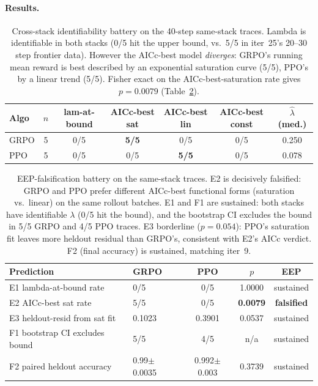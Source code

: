 \documentclass{article}
\begin{document}
\paragraph{Results.}

\begin{table}[t]
\centering\small
\begin{tabular}{lcccccc}
\toprule
Algo & $n$ & lam-at-bound & AICc-best sat & AICc-best lin & AICc-best const & $\hat\lambda$ (med.) \\
\midrule
GRPO & 5 & 0/5 & \textbf{5/5} & 0/5 & 0/5 & 0.250 \\
PPO  & 5 & 0/5 & 0/5 & \textbf{5/5} & 0/5 & 0.078 \\
\bottomrule
\end{tabular}
\caption{Cross-stack identifiability battery on the 40-step same-stack
  traces. Lambda is identifiable in both stacks (0/5 hit the upper
  bound, vs.\ 5/5 in iter~25's 20--30 step frontier data). However the
  AICc-best model \emph{diverges}: GRPO's running mean reward is best
  described by an exponential saturation curve (5/5), PPO's by a linear
  trend (5/5). Fisher exact on the AICc-best-saturation rate gives
  $p=0.0079$ (Table~\ref{tab:iter29-eep}).}
\label{tab:iter29-cross-stack}
\end{table}

\begin{table}[t]
\centering\small
\begin{tabular}{llccc}
\toprule
Prediction & GRPO & PPO & $p$ & EEP \\
\midrule
E1 lambda-at-bound rate       & 0/5        & 0/5        & 1.0000  & sustained \\
E2 AICc-best sat rate         & 5/5        & 0/5        & \textbf{0.0079} & \textbf{falsified} \\
E3 heldout-resid from sat fit & 0.1023     & 0.3901     & 0.0537  & sustained \\
F1 bootstrap CI excludes bound & 5/5       & 4/5        & n/a     & sustained \\
F2 paired heldout accuracy     & 0.99$\pm$0.0035 & 0.992$\pm$0.003 & 0.3739 & sustained \\
\bottomrule
\end{tabular}
\caption{EEP-falsification battery on the same-stack traces.
  E2 is decisively falsified: GRPO and PPO prefer different AICc-best
  functional forms (saturation vs.\ linear) on the same rollout batches.
  E1 and F1 are sustained: both stacks have identifiable $\lambda$ (0/5
  hit the bound), and the bootstrap CI excludes the bound in 5/5 GRPO
  and 4/5 PPO traces. E3 borderline ($p=0.054$): PPO's saturation fit
  leaves more heldout residual than GRPO's, consistent with E2's
  AICc verdict. F2 (final accuracy) is sustained, matching iter~9.}
\label{tab:iter29-eep}
\end{table}
\end{document}
